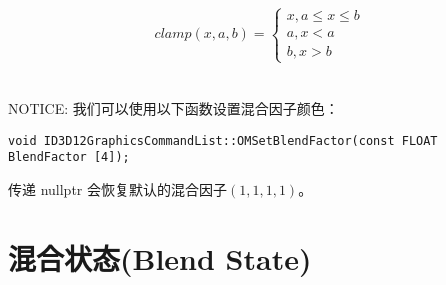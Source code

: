 \begin{align*}
clamp(x,a,b)=\left\{\begin{matrix}
x,a\leq x \leq b\\ 
a,x<a\\ 
b,x>b
\end{matrix}\right.
\end{align*}

\begin{flushleft}
~\\
NOTICE: 我们可以使用以下函数设置混合因子颜色：\\
\end{flushleft}
\begin{lstlisting}
void ID3D12GraphicsCommandList::OMSetBlendFactor(const FLOAT BlendFactor [4]); 
\end{lstlisting}

\begin{flushleft}
传递 nullptr 会恢复默认的混合因子$(1,1,1,1)$。
~\\
\end{flushleft}

\section{混合状态(Blend State)}
\begin{flushleft}

\end{flushleft}









